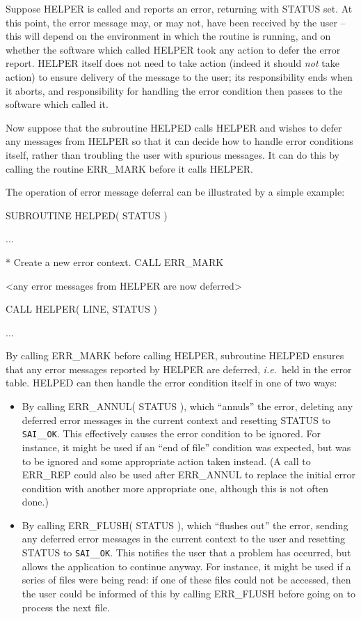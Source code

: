 \documentclass[twoside,11pt]{starlink}
\providecommand{\const}[1]{\texttt{#1}}
\providecommand{\saiok}{\const{SAI\_\_OK}}
\begin{document}
Suppose HELPER is called and reports an error, returning with STATUS set.
At this point, the error message may, or may not, have been received by the
user -- this will depend on the environment in which the routine is running,
and on whether the software which called HELPER took any action to defer the
error report.
HELPER itself does not need to take action (indeed it should \emph{not} take
action) to ensure delivery of the message to the user; its responsibility
ends when it aborts, and responsibility for handling the error condition then
passes to the software which called it.

Now suppose that the subroutine HELPED calls HELPER and wishes to defer any
messages from HELPER so that it can decide how to handle error conditions
itself, rather than troubling the user with spurious messages.
It can do this by calling the routine ERR\_MARK before it calls HELPER.

The operation of error message deferral can be illustrated by a simple
example:

\begin {small}
\begin{terminalv}
      SUBROUTINE HELPED( STATUS )

      ...

*  Create a new error context.
      CALL ERR_MARK

      <any error messages from HELPER are now deferred>

      CALL HELPER( LINE, STATUS )

      ...
\end{terminalv}
\end {small}

By calling ERR\_MARK before calling HELPER, subroutine HELPED ensures that any
error  messages reported by HELPER are deferred, \textit{i.e.}\ held in the error table.
HELPED can then handle the error condition itself in one of two ways:

\begin {itemize}
\item By calling ERR\_ANNUL( STATUS ), which ``annuls'' the error, deleting
any deferred error messages in the current context and resetting STATUS to
\saiok.
This effectively causes the error condition to be ignored.
For instance, it might be used if an ``end of file'' condition was expected,
but was to be ignored and some appropriate action taken instead.
(A call to ERR\_REP could also be used after ERR\_ANNUL to replace the
initial error condition with another more appropriate one, although this is
not often done.)

\item By calling ERR\_FLUSH( STATUS ), which ``flushes out'' the error,
sending any deferred error messages in the current context to the user and
resetting STATUS to \saiok.
This notifies the user that a problem has occurred, but allows the
application to continue anyway.
For instance, it might be used if a series of files were being read: if one
of these files could not be accessed, then the user could be informed of
this by calling ERR\_FLUSH before going on to process the next file.
\end{itemize}
\end{document}
